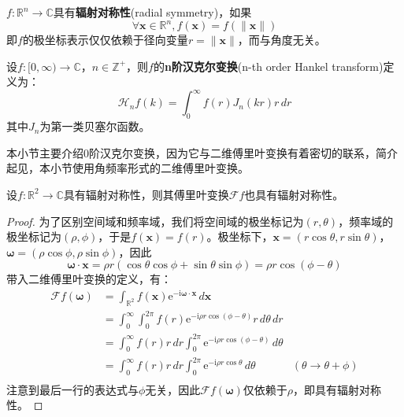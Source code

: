 \documentclass{ctexbook}
\begin{document}
\begin{definition}[辐射对称性]
    $f:\mathbb{R}^n\to\mathbb{C}$具有\textbf{辐射对称性}(radial symmetry)，如果
    $$\forall\mathbf{x}\in\mathbb{R}^n,f(\mathbf{x})=f(\|\mathbf{x}\|)$$
    即$f$的极坐标表示仅仅依赖于径向变量$r=\|\mathbf{x}\|$，而与角度无关。
\end{definition}

\begin{definition}[汉克尔变换]
    设$f:[0,\infty)\to\mathbb{C}$，$n\in\mathbb{Z}^+$，则$f$的\textbf{n阶汉克尔变换}(n-th order Hankel transform)定义为：
    \[\mathcal{H} _n f(k)=\int_0^{\infty}f(r)J_n(kr)r\,dr\]
    其中$J_n$为第一类贝塞尔函数。
\end{definition}

本小节主要介绍0阶汉克尔变换，因为它与二维傅里叶变换有着密切的联系，简介起见，本小节使用角频率形式的二维傅里叶变换。

\begin{lemma}
    设$f:\mathbb{R}^2\to\mathbb{C}$具有辐射对称性，则其傅里叶变换$\mathcal{F} f$也具有辐射对称性。
\end{lemma}
\begin{proof}
    为了区别空间域和频率域，我们将空间域的极坐标记为$(r,\theta)$，频率域的极坐标记为$(\rho,\phi)$，于是$f(\mathbf{x})=f(r)$。极坐标下，$\mathbf{x}=(r\cos\theta,r\sin\theta)$，$\boldsymbol{\omega}=(\rho\cos\phi,\rho\sin\phi)$，因此
    $$\boldsymbol{\omega}\cdot\mathbf{x}=\rho r(\cos\theta\cos\phi+\sin\theta\sin\phi)=\rho r \cos(\phi-\theta)$$
    带入二维傅里叶变换的定义，有：
    \begin{align*}
        \mathcal{F} f(\boldsymbol{\omega})&=\int_{\mathbb{R}^2}f(\mathbf{x})\mathrm{e}^{-\mathrm{i}\boldsymbol{\omega}\cdot\mathbf{x}}\,d\mathbf{x}\\
        &=\int_0^{\infty}\int_0^{2\pi}f(r)\mathrm{e}^{-\mathrm{i} \rho r \cos(\phi-\theta)}r\,d\theta\,dr\\
        &=\int_0^{\infty}f(r)r\,dr\int_0^{2\pi}\mathrm{e}^{-\mathrm{i} \rho r \cos(\phi-\theta)}\,d\theta\\
        &=\int_0^{\infty}f(r)r\,dr\int_0^{2\pi}\mathrm{e}^{-\mathrm{i} \rho r \cos\theta}\,d\theta&(\theta\to \theta+\phi)\\
    \end{align*}
    注意到最后一行的表达式与$\phi$无关，因此$\mathcal{F} f(\boldsymbol{\omega})$仅依赖于$\rho$，即具有辐射对称性。
\end{proof}
\end{document}
